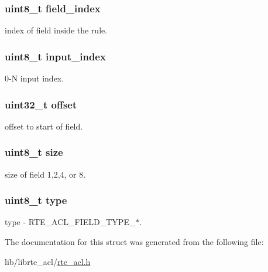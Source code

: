 \subsubsection[{field\+\_\+index}]{\setlength{\rightskip}{0pt plus 5cm}uint8\+\_\+t field\+\_\+index}\label{structrte__acl__field__def_aa63bd1fe49046f2c9ef0478a050b7c3a}
index of field inside the rule. \hypertarget{structrte__acl__field__def_a92f339699e74f468bf5355e4d76f6a79}{}
\subsubsection[{input\+\_\+index}]{\setlength{\rightskip}{0pt plus 5cm}uint8\+\_\+t input\+\_\+index}\label{structrte__acl__field__def_a92f339699e74f468bf5355e4d76f6a79}
0-\/\+N input index. \hypertarget{structrte__acl__field__def_a894bdfa2d603d8343f8ef01dda6fcd23}{}
\subsubsection[{offset}]{\setlength{\rightskip}{0pt plus 5cm}uint32\+\_\+t offset}\label{structrte__acl__field__def_a894bdfa2d603d8343f8ef01dda6fcd23}
offset to start of field. \hypertarget{structrte__acl__field__def_ae5dc6ffcd9b7605c7787791e40cc6bb0}{}
\subsubsection[{size}]{\setlength{\rightskip}{0pt plus 5cm}uint8\+\_\+t size}\label{structrte__acl__field__def_ae5dc6ffcd9b7605c7787791e40cc6bb0}
size of field 1,2,4, or 8. \hypertarget{structrte__acl__field__def_a1d127017fb298b889f4ba24752d08b8e}{}
\subsubsection[{type}]{\setlength{\rightskip}{0pt plus 5cm}uint8\+\_\+t type}\label{structrte__acl__field__def_a1d127017fb298b889f4ba24752d08b8e}
type -\/ R\+T\+E\+\_\+\+A\+C\+L\+\_\+\+F\+I\+E\+L\+D\+\_\+\+T\+Y\+P\+E\+\_\+$\ast$. 

The documentation for this struct was generated from the following file\+:\begin{DoxyCompactItemize}
\item 
lib/librte\+\_\+acl/\hyperlink{rte__acl_8h}{rte\+\_\+acl.\+h}\end{DoxyCompactItemize}
